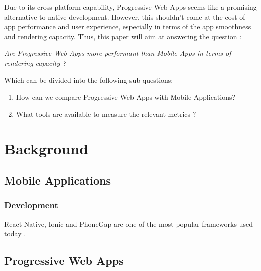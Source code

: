 \iffalse
Primary research question : 
\newline \textit{How efficient can Progressive Web Apps be compared to a Native Android Application?}
\newline
Secondary Research questions :
\\1. \textit{How can we compare Progressive Web Apps and Mobile Apps ?}
\newline \indent
1.1 \textit{What metrics are relevant to compare Progressive Web Apps and Mobile Apps ?}
\newline \indent  
1.2 \textit{What tools are available to measure those metrics?}
\newline
\\2. \textit{Are Progressive Web Apps more efficient than Mobile Apps with regards to the first question?}
\fi

Due to its cross-platform capability, Progressive Web Apps seems like a promising alternative to native development. However, this shouldn't come at the cost of app performance and user experience, especially in terms of the app smoothness and rendering capacity.
Thus, this paper will aim at answering the question : 
\begin{center}
    \textit{Are Progressive Web Apps more performant than Mobile Apps in terms of rendering capacity ?}
\end{center}
Which can be divided into the following sub-questions: 
\begin{enumerate}
    \item How can we compare Progressive Web Apps with Mobile Applications?
    \item What tools are available to measure the relevant metrics ?
\end{enumerate}

\chapter{Background}
\section{Mobile Applications}
\subsection{Development}

React Native, Ionic and PhoneGap are one of the most popular frameworks used today \cite{CrossPlatform_study}.

\section{Progressive Web Apps}
